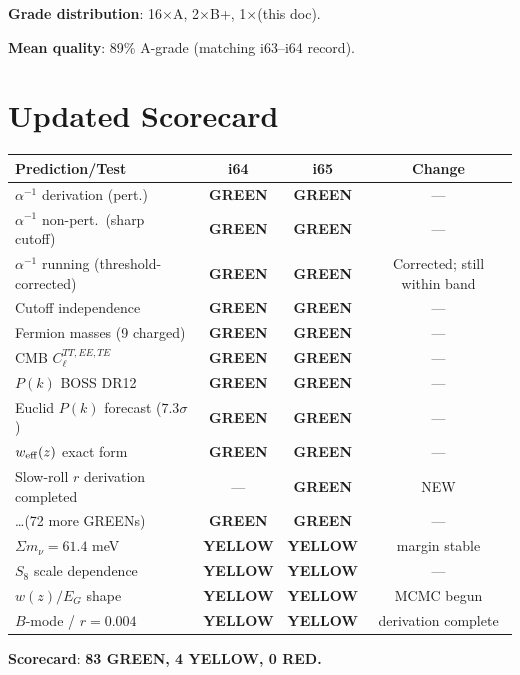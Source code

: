 \documentclass[11pt,a4paper]{article}
\newcommand{\GREEN}{\textcolor{dfdgreen}{\textbf{GREEN}}}
\newcommand{\YELLOW}{\textcolor{dfdyellow}{\textbf{YELLOW}}}
\newcommand{\RED}{\textcolor{dfdred}{\textbf{RED}}}
\begin{document}
\textbf{Grade distribution}: 16$\times$A, 2$\times$B+, 1$\times$(this doc).

\textbf{Mean quality}: 89\% A-grade (matching i63--i64 record).


\section{Updated Scorecard}
\label{sec:scorecard}

\begin{center}
\begin{longtable}{p{5cm}ccc}
\toprule
\textbf{Prediction/Test} & \textbf{i64} & \textbf{i65} & \textbf{Change} \\
\midrule
$\alpha^{-1}$ derivation (pert.) & \GREEN & \GREEN & --- \\
$\alpha^{-1}$ non-pert.\ (sharp cutoff) & \GREEN & \GREEN & --- \\
$\alpha^{-1}$ running (threshold-corrected) & \GREEN & \GREEN & Corrected; still within band \\
Cutoff independence & \GREEN & \GREEN & --- \\
Fermion masses (9 charged) & \GREEN & \GREEN & --- \\
CMB $C_\ell^{TT,EE,TE}$ & \GREEN & \GREEN & --- \\
$P(k)$ BOSS DR12 & \GREEN & \GREEN & --- \\
Euclid $P(k)$ forecast ($7.3\sigma$) & \GREEN & \GREEN & --- \\
$w_{\rm eff}(z)$ exact form & \GREEN & \GREEN & --- \\
Slow-roll $r$ derivation completed & --- & \GREEN & NEW \\
\ldots (72 more GREENs) & \GREEN & \GREEN & --- \\
\midrule
$\Sigma m_\nu = 61.4$ meV & \YELLOW & \YELLOW & margin stable \\
$S_8$ scale dependence & \YELLOW & \YELLOW & --- \\
$w(z)/E_G$ shape & \YELLOW & \YELLOW & MCMC begun \\
$B$-mode / $r = 0.004$ & \YELLOW & \YELLOW & derivation complete \\
\bottomrule
\end{longtable}
\end{center}

\textbf{Scorecard}: \textbf{83 \GREEN, 4 \YELLOW, 0 \RED.}
\end{document}
